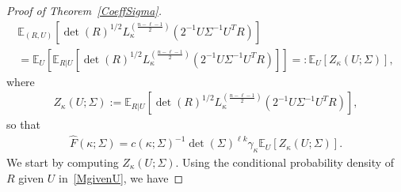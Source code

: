 \documentclass[AHL,Unicode,longabstracts,published]{cedram}
\newcommand{\EX}[2]{\mathbb{E}_{#1}\left[#2\right]}
\begin{document}
\begin{proof}[Proof of Theorem~\ref{CoeffSigma}]
\begin{multline*}
\EX{(R,U)}{ \det(R)^{1/2} L_{\kappa}^{\left(\frac{n-\ell-1}{2}\right)}\left(2^{-1}U\Sigma^{-1}U^TR\right) } \\
=\EX{U}{\EX{R|U}{\det(R)^{1/2} L_{\kappa}^{\left(\frac{n-\ell-1}{2}\right)}\left(2^{-1}U\Sigma^{-1}U^TR\right)}} =: \EX{U}{Z_{\kappa}(U;\Sigma)},
\end{multline*}
where
\begin{gather*}
Z_{\kappa}(U;\Sigma):=\EX{R|U}{\det(R)^{1/2} L_{\kappa}^{\left(\frac{n-\ell-1}{2}\right)}\left(2^{-1}U\Sigma^{-1}U^TR\right)},
\end{gather*}
so that
\begin{gather}\label{FSigma}
\widehat{F}(\kappa; \Sigma) = c(\kappa;\Sigma)^{-1} \det(\Sigma)^{\ell k} \gamma_{\kappa}
\EX{U}{Z_{\kappa}(U;\Sigma)}.
\end{gather}
We start by computing $Z_{\kappa}(U;\Sigma)$. Using the conditional probability density of $R$ given $U$ in~\eqref{MgivenU}, we have


\end{proof}
\end{document}
